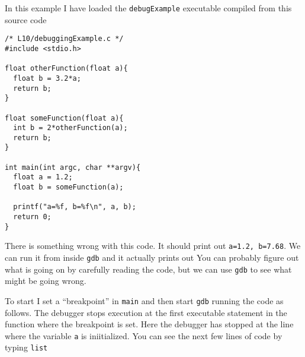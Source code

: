 In this example I have loaded the \texttt{debugExample} executable compiled from this source code
\begin{verbatim}
/* L10/debuggingExample.c */
#include <stdio.h>

float otherFunction(float a){
  float b = 3.2*a;
  return b;
}

float someFunction(float a){
  int b = 2*otherFunction(a);
  return b;
}

int main(int argc, char **argv){
  float a = 1.2;
  float b = someFunction(a);

  printf("a=%f, b=%f\n", a, b);
  return 0;
}
\end{verbatim}

There is something wrong with this code. It should print out \texttt{a=1.2, b=7.68}. We can run it from inside \texttt{gdb} and it actually prints out 
You can probably figure out what is going on by carefully reading the code, but we can use \texttt{gdb} to see what might be going wrong. 

To start I set a ``breakpoint'' in \texttt{main} and then start \texttt{gdb} running the code as follows.
The debugger stops execution at the first executable statement in the function where the breakpoint is set. Here the debugger has stopped at the line where the variable \texttt{a} is iniitialized. You can see the next few lines of  code by typing \texttt{list}


